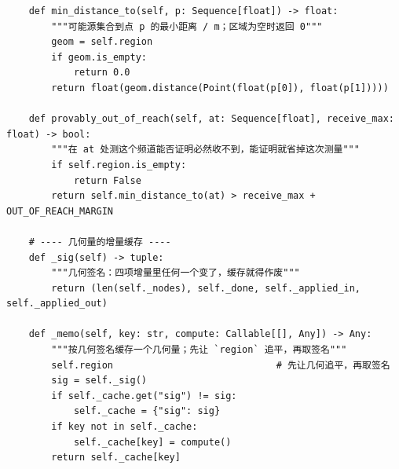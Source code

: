 \documentclass[UTF8, zihao=5,AutoFakeBold=2]{ctexart}
\begin{document}
\begin{lstlisting}
    def min_distance_to(self, p: Sequence[float]) -> float:
        """可能源集合到点 p 的最小距离 / m；区域为空时返回 0"""
        geom = self.region
        if geom.is_empty:
            return 0.0
        return float(geom.distance(Point(float(p[0]), float(p[1]))))

    def provably_out_of_reach(self, at: Sequence[float], receive_max: float) -> bool:
        """在 at 处测这个频道能否证明必然收不到，能证明就省掉这次测量"""
        if self.region.is_empty:
            return False
        return self.min_distance_to(at) > receive_max + OUT_OF_REACH_MARGIN

    # ---- 几何量的增量缓存 ----
    def _sig(self) -> tuple:
        """几何签名：四项增量里任何一个变了，缓存就得作废"""
        return (len(self._nodes), self._done, self._applied_in, self._applied_out)

    def _memo(self, key: str, compute: Callable[[], Any]) -> Any:
        """按几何签名缓存一个几何量；先让 `region` 追平，再取签名"""
        self.region                             # 先让几何追平，再取签名
        sig = self._sig()
        if self._cache.get("sig") != sig:
            self._cache = {"sig": sig}
        if key not in self._cache:
            self._cache[key] = compute()
        return self._cache[key]
	\end{lstlisting}
\end{document}
